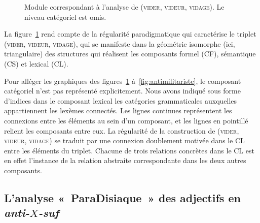 \documentclass[output=paper]{langsci/langscibook}
\begin{document}
%
\begin{figure}
  \centering
  \caption{Module correspondant à l'analyse de (\textsc{vider}, \textsc{videur}, \textsc{vidage}).  Le niveau catégoriel est omis.}
  \label{fig:module-regulier}
\end{figure}
%
La figure~\ref{fig:module-regulier} rend compte de la régularité paradigmatique qui caractérise le triplet (\textsc{vider}, \textsc{videur}, \textsc{vidage}), qui se manifeste dans la géométrie isomorphe (ici, triangulaire) des structures qui réalisent les composants formel (CF), sémantique (CS) et lexical (CL).

Pour alléger les graphiques des figures~\ref{fig:module-regulier} à~\ref{fig:antimilitariste}, le composant catégoriel n'est pas représenté explicitement.  Nous avons indiqué sous forme d'indices dans le composant lexical les catégories grammaticales auxquelles appartiennent les lexèmes connectés.  Les lignes continues représentent les connexions entre les éléments au sein d'un composant, et les lignes en pointillé relient les composants entre eux.  La régularité de la construction de (\textsc{vider}, \textsc{videur}, \textsc{vidage}) se traduit par une connexion doublement motivée dans le CL entre les éléments du triplet. Chacune de trois relations concrètes dans le CL est en effet l'instance de la relation abstraite correspondante dans les deux autres composants.

\subsection{L'analyse «~\textsf{ParaDisiaque}~» des adjectifs en \emph{\mbox{anti-$X$-suf}}}
\label{sec:analyse-anti}


\end{document}
